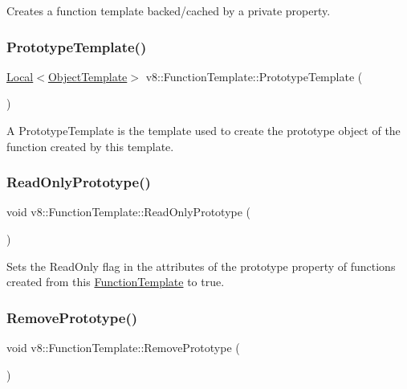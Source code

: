 Creates a function template backed/cached by a private property. \mbox{\label{classv8_1_1FunctionTemplate_aa2bcc2652b5f0fdbc666d943ccf72021}} 
\subsubsection{\texorpdfstring{Prototype\+Template()}{PrototypeTemplate()}}
{\footnotesize\ttfamily \mbox{\hyperlink{classv8_1_1Local}{Local}}$<$\mbox{\hyperlink{classv8_1_1ObjectTemplate}{Object\+Template}}$>$ v8\+::\+Function\+Template\+::\+Prototype\+Template (\begin{DoxyParamCaption}{ }\end{DoxyParamCaption})}

A Prototype\+Template is the template used to create the prototype object of the function created by this template. \mbox{\label{classv8_1_1FunctionTemplate_a91d2e0643e8c5a53ab1d75f7766c2422}} 
\subsubsection{\texorpdfstring{Read\+Only\+Prototype()}{ReadOnlyPrototype()}}
{\footnotesize\ttfamily void v8\+::\+Function\+Template\+::\+Read\+Only\+Prototype (\begin{DoxyParamCaption}{ }\end{DoxyParamCaption})}

Sets the Read\+Only flag in the attributes of the \textquotesingle{}prototype\textquotesingle{} property of functions created from this \mbox{\hyperlink{classv8_1_1FunctionTemplate}{Function\+Template}} to true. \mbox{\label{classv8_1_1FunctionTemplate_a4a184aca244174c7fe52d58871d3129e}} 
\subsubsection{\texorpdfstring{Remove\+Prototype()}{RemovePrototype()}}
{\footnotesize\ttfamily void v8\+::\+Function\+Template\+::\+Remove\+Prototype (\begin{DoxyParamCaption}{ }\end{DoxyParamCaption})}

